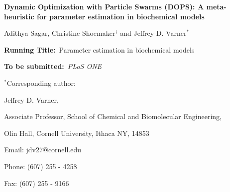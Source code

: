 \documentclass[12pt]{article}
\begin{document}
\begin{titlepage}
{\par\centering\textbf{\Large {Dynamic Optimization with Particle Swarms (DOPS): A meta-heuristic for parameter estimation in biochemical models}}}
\vspace{0.05in}
{\par \centering \large{Adithya Sagar, Christine Shoemaker$^{\dag}$ and Jeffrey D. Varner$^{*}$}}
\vspace{0.10in}
{\par {}}
{\par {}}
{\par {}}
\vspace{0.1in}
{\par \centering \textbf{Running Title:}~Parameter estimation in biochemical models}
\vspace{0.1in}
{\par \centering \textbf{To be submitted:}~\emph{PLoS ONE}}
\vspace{0.5in}
{\par \centering $^{*}$Corresponding author:}
{\par \centering Jeffrey D. Varner,}
{\par \centering Associate Professor, School of Chemical and Biomolecular Engineering,}
{\par {} Olin Hall, Cornell University, Ithaca NY, 14853}
{\par \centering Email: jdv27@cornell.edu}
{\par \centering Phone: (607) 255 - 4258}
{\par \centering Fax: (607) 255 - 9166}
\end{titlepage}
\date{}
\thispagestyle{empty}
\pagebreak
\end{document}
